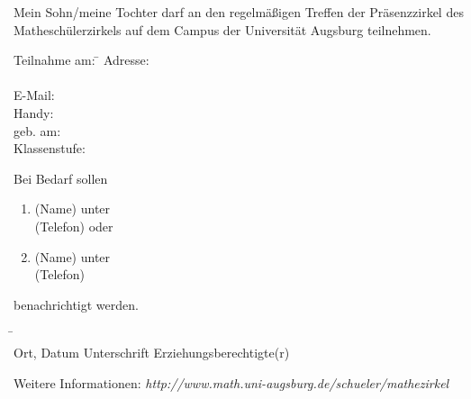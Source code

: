\documentclass{mamazettel}
\begin{document}
\renewcommand{\betreff}{Anmeldung zum Matheschülerzirkel der Universität Augsburg}

\makeletterhead

Mein Sohn/meine Tochter \freist{} darf an den regelmäßigen Treffen der
Präsenzzirkel des Matheschülerzirkels auf dem Campus der Universität Augsburg
teilnehmen.

\doublespacing

\begin{tabbing}
  Teilnahme am: \= \kill
  Adresse: \> \freist \\
  \> \freist \\
  E-Mail: \> \freist \\
  Handy: \> \freist \\
  geb. am: \> \freist \\
  Klassenstufe: \> \freistKurz
\end{tabbing}

Bei Bedarf sollen
\begin{enumerate}
\item \freist{} (Name) unter \\ \freist{} (Telefon) oder
\item \freist{} (Name) unter \\ \freist{} (Telefon)
\end{enumerate}
benachrichtigt werden.

\begin{tabbing}
  \freistMittel \qquad\qquad \= \kill
  \freistMittel \> \freistLaenger \\
  Ort, Datum \> Unterschrift Erziehungsberechtigte(r)
\end{tabbing}

\vfill
\scriptsize
Weitere Informationen:
\textsl{http:/\!/www.math.uni-augsburg.de/schueler/mathezirkel}
\end{document}

